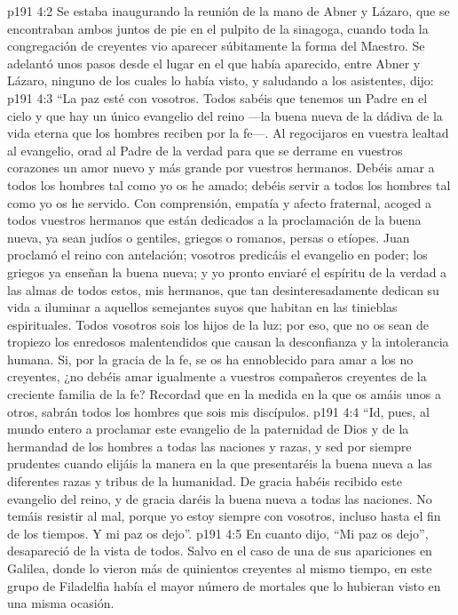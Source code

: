 \vs p191 4:2 Se estaba inaugurando la reunión de la mano de Abner y Lázaro, que se encontraban ambos juntos de pie en el pulpito de la sinagoga, cuando toda la congregación de creyentes vio aparecer súbitamente la forma del Maestro. Se adelantó unos pasos desde el lugar en el que había aparecido, entre Abner y Lázaro, ninguno de los cuales lo había visto, y saludando a los asistentes, dijo:
\vs p191 4:3 \pc “La paz esté con vosotros. Todos sabéis que tenemos un Padre en el cielo y que hay un único evangelio del reino ---la buena nueva de la dádiva de la vida eterna que los hombres reciben por la fe---. Al regocijaros en vuestra lealtad al evangelio, orad al Padre de la verdad para que se derrame en vuestros corazones un amor nuevo y más grande por vuestros hermanos. Debéis amar a todos los hombres tal como yo os he amado; debéis servir a todos los hombres tal como yo os he servido. Con comprensión, empatía y afecto fraternal, acoged a todos vuestros hermanos que están dedicados a la proclamación de la buena nueva, ya sean judíos o gentiles, griegos o romanos, persas o etíopes. Juan proclamó el reino con antelación; vosotros predicáis el evangelio en poder; los griegos ya enseñan la buena nueva; y yo pronto enviaré el espíritu de la verdad a las almas de todos estos, mis hermanos, que tan desinteresadamente dedican su vida a iluminar a aquellos semejantes suyos que habitan en las tinieblas espirituales. Todos vosotros sois los hijos de la luz; por eso, que no os sean de tropiezo los enredosos malentendidos que causan la desconfianza y la intolerancia humana. Si, por la gracia de la fe, se os ha ennoblecido para amar a los no creyentes, ¿no debéis amar igualmente a vuestros compañeros creyentes de la creciente familia de la fe? Recordad que en la medida en la que os amáis unos a otros, sabrán todos los hombres que sois mis discípulos.
\vs p191 4:4 “Id, pues, al mundo entero a proclamar este evangelio de la paternidad de Dios y de la hermandad de los hombres a todas las naciones y razas, y sed por siempre prudentes cuando elijáis la manera en la que presentaréis la buena nueva a las diferentes razas y tribus de la humanidad. De gracia habéis recibido este evangelio del reino, y de gracia daréis la buena nueva a todas las naciones. No temáis resistir al mal, porque yo estoy siempre con vosotros, incluso hasta el fin de los tiempos. Y mi paz os dejo”.
\vs p191 4:5 \pc En cuanto dijo, “Mi paz os dejo”, desapareció de la vista de todos. Salvo en el caso de una de sus apariciones en Galilea, donde lo vieron más de quinientos creyentes al mismo tiempo, en este grupo de Filadelfia había el mayor número de mortales que lo hubieran visto en una misma ocasión.
